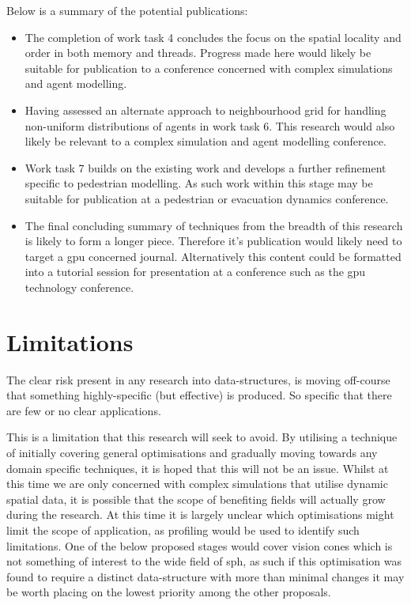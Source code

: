     Below is a summary of the potential publications:
    \begin{itemize}
      \item The completion of work task 4 concludes the focus on the spatial locality and order in both memory and threads. Progress made here would likely be suitable for publication to a conference concerned with complex simulations and agent modelling.
      \item Having assessed an alternate approach to neighbourhood grid for handling non-uniform distributions of agents in work task 6. This research would also likely be relevant to a complex simulation and agent modelling conference.
      \item Work task 7 builds on the existing work and develops a further refinement specific to pedestrian modelling. As such work within this stage may be suitable for publication at a pedestrian or evacuation dynamics conference.
      \item The final concluding summary of techniques from the breadth of this research is likely to form a longer piece. Therefore it's publication would likely need to target a \gls{gpu} concerned journal. Alternatively this content could be formatted into a tutorial session for presentation at a conference such as the \gls{gpu} technology conference.
    \end{itemize} 
  
  \section{Limitations}
    The clear risk present in any research into data-structures, is moving off-course that something highly-specific (but effective) is produced. So specific that there are few or no clear applications.
    
    This is a limitation that this research will seek to avoid. By utilising a technique of initially covering general optimisations and gradually moving towards any domain specific techniques, it is hoped that this will not be an issue. Whilst at this time we are only concerned with complex simulations that utilise dynamic spatial data, it is possible that the scope of benefiting fields will actually grow during the research. At this time it is largely unclear which optimisations might limit the scope of application, as profiling would be used to identify such limitations. One of the below proposed stages would cover vision cones which is not something of interest to the wide field of \gls{sph}, as such if this optimisation was found to require a distinct data-structure with more than minimal changes it may be worth placing on the lowest priority among the other proposals.
    
